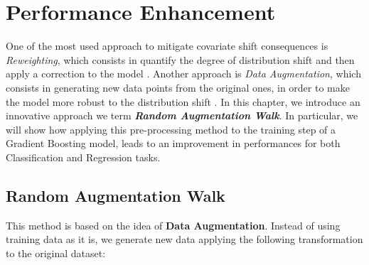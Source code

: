 \chapter{Performance Enhancement}

One of the most used approach to mitigate covariate shift consequences is \textit{Reweighting}, which consists in quantify the degree of distribution shift and then apply a correction to the model \cite{zhang}. Another approach is \textit{Data Augmentation}, which consists in generating new data points from the original ones, in order to make the model more robust to the distribution shift \cite{zhao}. In this chapter, we introduce an innovative approach we term \textbf{\textit{Random Augmentation Walk}}. In particular, we will show how applying this pre-processing method to the training step of a Gradient Boosting model, leads to an improvement in performances for both Classification and Regression tasks.


\section{Random Augmentation Walk}

This method is based on the idea of \textbf{Data Augmentation}. Instead of using training data as it is, we generate new data applying the following transformation to the original dataset:



